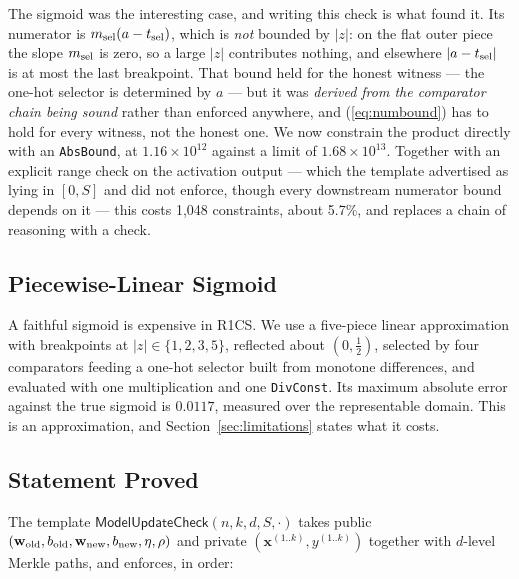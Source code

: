 \documentclass{llncs}
\begin{document}
The sigmoid was the interesting case, and writing this check is what found it.
Its numerator is $m_{\rm sel}(a - t_{\rm sel})$, which is \emph{not} bounded by
$|z|$: on the flat outer piece the slope $m_{\rm sel}$ is zero, so a large $|z|$
contributes nothing, and elsewhere $|a - t_{\rm sel}|$ is at most the last
breakpoint. That bound held for the honest witness --- the one-hot selector is
determined by $a$ --- but it was \emph{derived from the comparator chain being
sound} rather than enforced anywhere, and (\ref{eq:numbound}) has to hold for
every witness, not the honest one. We now constrain the product directly with an
\texttt{AbsBound}, at $1.16 \times 10^{12}$ against a limit of $1.68 \times
10^{13}$. Together with an explicit range check on the activation output ---
which the template advertised as lying in $[0, S]$ and did not enforce, though
every downstream numerator bound depends on it --- this costs 1{,}048
constraints, about 5.7\%, and replaces a chain of reasoning with a check.

\subsection{Piecewise-Linear Sigmoid}

A faithful sigmoid is expensive in R1CS. We use a five-piece linear
approximation with breakpoints at $|z| \in \{1, 2, 3, 5\}$, reflected about
$(0, \tfrac{1}{2})$, selected by four comparators feeding a one-hot selector
built from monotone differences, and evaluated with one multiplication and one
\texttt{DivConst}. Its maximum absolute error against the true sigmoid is
$0.0117$, measured over the representable domain. This is an approximation, and
Section~\ref{sec:limitations} states what it costs.

\subsection{Statement Proved}

The template $\textsf{ModelUpdateCheck}(n, k, d, S, \cdot)$ takes public
$(\mathbf{w}_{\rm old}, b_{\rm old}, \mathbf{w}_{\rm new}, b_{\rm new}, \eta,
\rho)$ and private $(\mathbf{x}^{(1..k)}, y^{(1..k)})$ together with $d$-level
Merkle paths, and enforces, in order:
\end{document}
